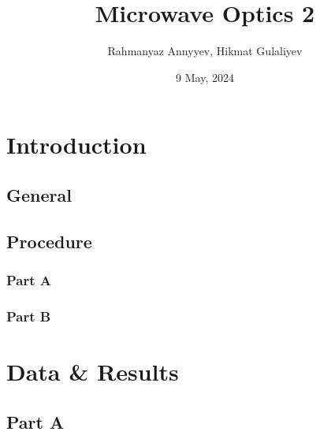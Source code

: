 \documentclass[10pt]{article}
\title{Microwave Optics 2}
\author{Rahmanyaz Annyyev, Hikmat Gulaliyev}
\date{9 May, 2024}
\begin{document}
\maketitle

\begin{abstract}

\end{abstract}

\section{Introduction}

\subsection*{General}

\subsection*{Procedure}

\subsubsection*{Part A}

\subsubsection*{Part B}

\section{Data \& Results}

\subsection*{Part A}
\end{document}
